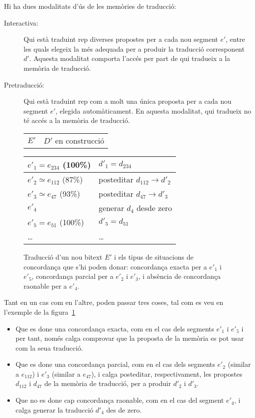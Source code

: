 Hi ha dues modalitats d'ús de les memòries de traducció:
\begin{description}
\item[Interactiva:] Qui està traduint rep diverses propostes per a
  cada nou segment $e'$, entre les quals elegeix la més adequada per a
  produir la traducció corresponent $d'$. Aquesta modalitat comporta
  l'accés per part de qui tradueix a la memòria de traducció.
\item[Pretraducció:] Qui està traduint rep com a molt una única
  proposta per a cada nou segment $e'$, elegida automàticament. En
  aquesta modalitat, qui tradueix no té accés a la memòria de
  traducció.
\end{description}
\begin{figure}
  \begin{center}
    \begin{tabular}{p{3cm}p{4cm}}
           $E'$ & $D'$ en construcció      
    \end{tabular}
    \begin{tabular}{|p{3cm}|p{4cm}|}
\hline
        $e'_1=e_{234}$ (100\%)& $d'_1=d_{234}$ \\\hline
        $e'_2\simeq e_{112}$ (87\%) & posteditar $d_{112} \to d'_2$ \\\hline
        $e'_3\simeq e_{47}$ (93\%) & posteditar $d_{47} \to d'_3$ \\\hline
        $e'_4$ & generar $d_4$ desde zero \\\hline
        $e'_5=e_{51}$ (100\%) & $d'_5=d_{51}$ \\\hline
        \ldots & \ldots \\\hline
    \end{tabular}
  \end{center}
  \caption{Traducció d'un nou bitext $E'$ i els tipus de situacions de concordança que s'hi poden donar: concordança exacta per a $e'_1$ i $e'_5$, concordança parcial per a $e'_2$ i $e'_3$, i absència de concordança raonable per a $e'_4$.}
  \label{fg:pretrad}
\end{figure}
Tant en un cas com en l'altre, poden passar tres coses, tal com es veu en l'exemple de la figura~\ref{fg:pretrad}
\begin{itemize}
\item Que es done una concordança exacta, com en el cas dels segments $e'_1$ i
  $e'_5$ i per tant, només calga comprovar que la proposta de la
  memòria es pot usar com la seua traducció.
\item Que es done una concordança parcial, com en el cas dels segments
  $e'_2$ (similar a $e_{112}$) i $e'_3$ (similar a $e_{47}$), i calga
  posteditar, respectivament, les propostes $d_{112}$ i $d_{47}$ de la
  memòria de traducció, per a produir $d'_2$ i $d'_3$.
\item Que no es done cap concordança raonable, com en el cas del segment $e'_4$, i calga generar la traducció $d'_4$ des de zero.
\end{itemize}

